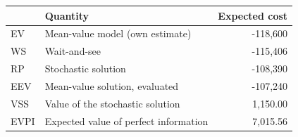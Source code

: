 \begin{tabular}{llr}
\toprule
 & Quantity & Expected cost \\
\midrule
EV & Mean-value model (own estimate) & -118,600 \\
WS & Wait-and-see & -115,406 \\
RP & Stochastic solution & -108,390 \\
EEV & Mean-value solution, evaluated & -107,240 \\
VSS & Value of the stochastic solution & 1,150.00 \\
EVPI & Expected value of perfect information & 7,015.56 \\
\bottomrule
\end{tabular}

